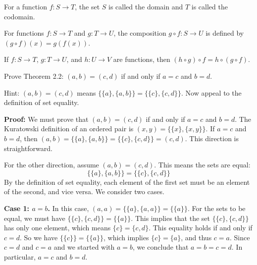 \begin{definition}
For a function $f: S \to T$, the set $S$ is called the domain and $T$ is called the codomain.
\end{definition}

\begin{definition}
For functions $f: S \to T$ and $g: T \to U$, the composition $g \circ f: S \to U$ is defined by $(g \circ f)(x) = g(f(x))$.
\end{definition}

\begin{theorem}
If $f: S \to T$, $g: T \to U$, and $h: U \to V$ are functions, then $(h \circ g) \circ f = h \circ (g \circ f)$.
\end{theorem}

\begin{problembox}
Prove Theorem 2.2: $(a, b) = (c, d)$ if and only if $a=c$ and $b=d$.

Hint: $(a, b) = (c, d)$ means $\{\{a\}, \{a, b\}\} = \{\{c\}, \{c, d\}\}$. Now appeal to the definition of set equality.
\end{problembox}

\textbf{Proof:}  
We must prove that $(a, b) = (c, d)$ if and only if $a=c$ and $b=d$.
The Kuratowski definition of an ordered pair is $(x, y) = \{\{x\}, \{x, y\}\}$.
If $a=c$ and $b=d$, then $(a,b) = \{\{a\}, \{a,b\}\} = \{\{c\}, \{c,d\}\} = (c,d)$. This direction is straightforward.

For the other direction, assume $(a, b) = (c, d)$. This means the sets are equal:
\[ \{\{a\}, \{a, b\}\} = \{\{c\}, \{c, d\}\} \]
By the definition of set equality, each element of the first set must be an element of the second, and vice versa. We consider two cases.

\textbf{Case 1: $a=b$.}
In this case, $(a, a) = \{\{a\}, \{a, a\}\} = \{\{a\}\}$.
For the sets to be equal, we must have $\{\{c\}, \{c, d\}\} = \{\{a\}\}$. This implies that the set $\{\{c\}, \{c, d\}\}$ has only one element, which means $\{c\} = \{c, d\}$. This equality holds if and only if $c=d$.
So we have $\{\{c\}\} = \{\{a\}\}$, which implies $\{c\} = \{a\}$, and thus $c=a$.
Since $c=d$ and $c=a$ and we started with $a=b$, we conclude that $a = b = c = d$. In particular, $a=c$ and $b=d$.

